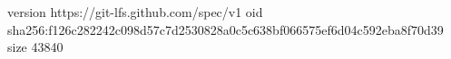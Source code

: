 version https://git-lfs.github.com/spec/v1
oid sha256:f126c282242c098d57c7d2530828a0c5c638bf066575ef6d04c592eba8f70d39
size 43840
